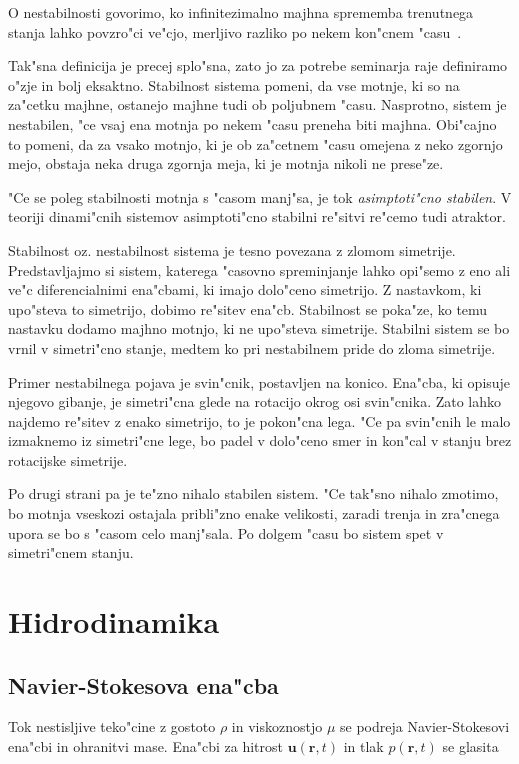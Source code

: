 \documentclass[a4paper,10pt]{article}
\renewcommand{\vec}{\mathbf}
\newcommand{\rt}{(\vec r, t)}
\begin{document}
O nestabilnosti govorimo, ko infinitezimalno majhna sprememba trenutnega stanja lahko povzro"ci ve"cjo, merljivo razliko po nekem kon"cnem "casu~\cite{drazin}. 

Tak"sna definicija je precej splo"sna, zato jo za potrebe seminarja raje definiramo o"zje in bolj eksaktno. Stabilnost sistema pomeni, da vse motnje, ki so na za"cetku majhne, ostanejo majhne tudi ob poljubnem "casu. Nasprotno, sistem je nestabilen, "ce vsaj ena motnja po nekem "casu preneha biti majhna. Obi"cajno to pomeni, da za vsako motnjo, ki je ob za"cetnem "casu omejena z neko zgornjo mejo, obstaja neka druga zgornja meja, ki je motnja nikoli ne prese"ze. 

"Ce se poleg stabilnosti motnja s "casom manj"sa, je tok \emph{asimptoti"cno stabilen}. V teoriji dinami"cnih sistemov asimptoti"cno stabilni re"sitvi re"cemo tudi atraktor. 

Stabilnost oz. nestabilnost sistema je tesno povezana z zlomom simetrije. Predstavljajmo si sistem, katerega "casovno spreminjanje lahko opi"semo z eno ali ve"c diferencialnimi ena"cbami, ki imajo dolo"ceno simetrijo. Z nastavkom, ki upo"steva to simetrijo, dobimo re"sitev ena"cb. Stabilnost se poka"ze, ko temu nastavku dodamo majhno motnjo, ki ne upo"steva simetrije. Stabilni sistem se bo vrnil v simetri"cno stanje, medtem ko pri nestabilnem pride do zloma simetrije. 

Primer nestabilnega pojava je svin"cnik, postavljen na konico. Ena"cba, ki opisuje njegovo gibanje, je simetri"cna glede na rotacijo okrog osi svin"cnika. Zato lahko najdemo re"sitev z enako simetrijo, to je pokon"cna lega. "Ce pa svin"cnih le malo izmaknemo iz simetri"cne lege, bo padel v dolo"ceno smer in kon"cal v stanju brez rotacijske simetrije. 

Po drugi strani pa je te"zno nihalo stabilen sistem. "Ce tak"sno nihalo zmotimo, bo motnja vseskozi ostajala pribli"zno enake velikosti, zaradi trenja in zra"cnega upora se bo s "casom celo manj"sala. Po dolgem "casu bo sistem spet v simetri"cnem stanju. 


\section{Hidrodinamika}

\subsection{Navier-Stokesova ena"cba}

Tok nestisljive teko"cine z gostoto $\rho$ in viskoznostjo $\mu$ se podreja Navier-Stokesovi ena"cbi in ohranitvi mase. Ena"cbi za hitrost $\vec u\rt$ in tlak $p\rt$ se glasita
\end{document}
